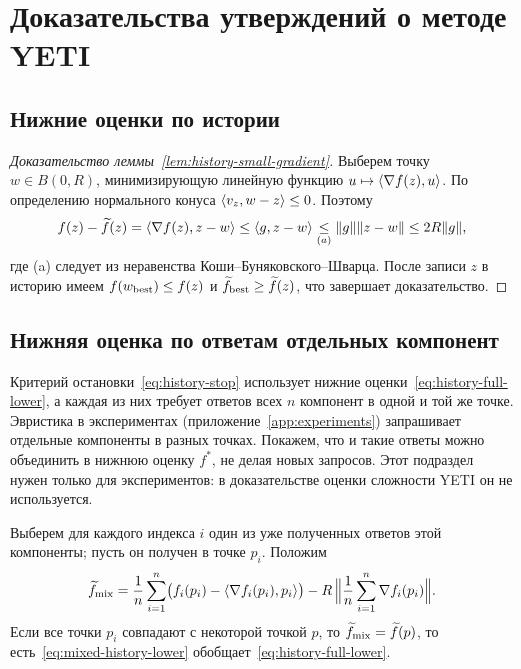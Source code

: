 \section{Доказательства утверждений о методе YETI}\label{app:cheap-proofs}

\subsection{Нижние оценки по истории}\label{app:history-proofs}

\begin{proof}[Доказательство леммы~\ref{lem:history-small-gradient}]
Выберем точку $w\in B(0,R)$, минимизирующую линейную функцию
$u\mapsto\langle \nabla f(z),u\rangle$. По определению нормального конуса
$\langle v_z,w-z\rangle\le0$. Поэтому
\[
 f(z)-\widetilde f(z)=\langle \nabla f(z),z-w\rangle
 \le\langle g,z-w\rangle
 \mathrel{\underset{(a)}{\le}}\lVert g\rVert\lVert z-w\rVert
 \le2R\lVert g\rVert,
\]
где (a) следует из неравенства Коши--Буняковского--Шварца.
После записи $z$ в историю имеем $f(w_{\rm best})\le f(z)$ и
$\widetilde f_{\rm best}\ge\widetilde f(z)$, что завершает доказательство.
\end{proof}

\subsection{Нижняя оценка по ответам отдельных компонент}\label{app:component-history}

Критерий остановки~\eqref{eq:history-stop} использует нижние
оценки~\eqref{eq:history-full-lower}, а каждая из них требует ответов
всех $n$ компонент в одной и той же точке. Эвристика в экспериментах
(приложение~\ref{app:experiments}) запрашивает отдельные компоненты
в разных точках. Покажем, что и такие ответы можно объединить в нижнюю
оценку $f^\ast$, не делая новых запросов. Этот подраздел нужен только
для экспериментов: в доказательстве оценки сложности YETI он
не используется.

Выберем для каждого индекса $i$ один из уже полученных ответов
этой компоненты; пусть он получен в точке $p_i$. Положим
\begin{equation}\label{eq:mixed-history-lower}
 \widetilde f_{\rm mix}
 =\frac1n\sum_{i=1}^n\bigl(f_i(p_i)-\langle \nabla f_i(p_i),p_i\rangle\bigr)
 -R\,\Bigl\|\frac1n\sum_{i=1}^n\nabla f_i(p_i)\Bigr\|.
\end{equation}
Если все точки $p_i$ совпадают с некоторой точкой $p$, то
$\widetilde f_{\rm mix}=\widetilde f(p)$, то есть~\eqref{eq:mixed-history-lower}
обобщает~\eqref{eq:history-full-lower}.

